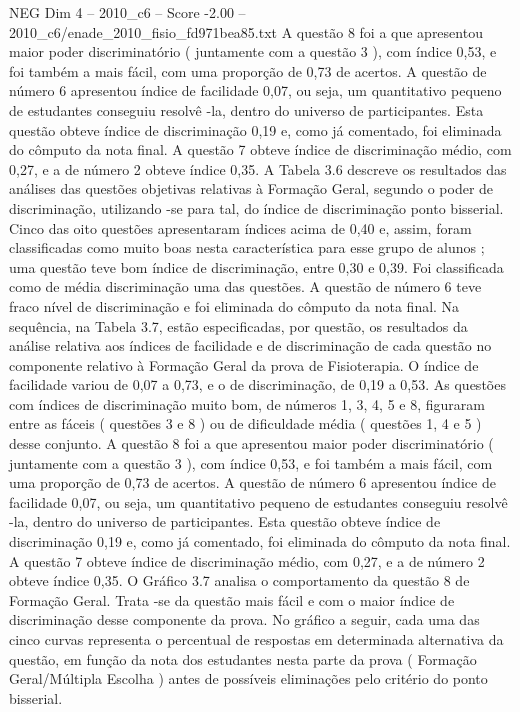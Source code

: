 \begin{textsample}{NEG Dim 4 – 2010\_c6 – Score -2.00 – 2010\_c6/enade\_2010\_fisio\_fd971bea85.txt}
A questão 8 foi a que apresentou maior poder discriminatório ( juntamente com a questão 3 ), com índice 0,53, e foi também a mais fácil, com uma proporção de 0,73 de acertos.
A questão de número 6 apresentou índice de facilidade 0,07, ou seja, um quantitativo pequeno de estudantes conseguiu resolvê -la, dentro do universo de participantes.
Esta questão obteve índice de discriminação 0,19 e, como já comentado, foi eliminada do cômputo da nota final.
A questão 7 obteve índice de discriminação médio, com 0,27, e a de número 2 obteve índice 0,35.
A Tabela 3.6 descreve os resultados das análises das questões objetivas relativas à Formação Geral, segundo o poder de discriminação, utilizando -se para tal, do índice de discriminação ponto bisserial.
Cinco das oito questões apresentaram índices acima de 0,40 e, assim, foram classificadas como muito boas nesta característica para esse grupo de alunos ; uma questão teve bom índice de discriminação, entre 0,30 e 0,39.
Foi classificada como de média discriminação uma das questões.
A questão de número 6 teve fraco nível de discriminação e foi eliminada do cômputo da nota final.
Na sequência, na Tabela 3.7, estão especificadas, por questão, os resultados da análise relativa aos índices de facilidade e de discriminação de cada questão no componente relativo à Formação Geral da prova de Fisioterapia.
O índice de facilidade variou de 0,07 a 0,73, e o de discriminação, de 0,19 a 0,53.
As questões com índices de discriminação muito bom, de números 1, 3, 4, 5 e 8, figuraram entre as fáceis ( questões 3 e 8 ) ou de dificuldade média ( questões 1, 4 e 5 ) desse conjunto.
A questão 8 foi a que apresentou maior poder discriminatório ( juntamente com a questão 3 ), com índice 0,53, e foi também a mais fácil, com uma proporção de 0,73 de acertos.
A questão de número 6 apresentou índice de facilidade 0,07, ou seja, um quantitativo pequeno de estudantes conseguiu resolvê -la, dentro do universo de participantes.
Esta questão obteve índice de discriminação 0,19 e, como já comentado, foi eliminada do cômputo da nota final.
A questão 7 obteve índice de discriminação médio, com 0,27, e a de número 2 obteve índice 0,35.
O Gráfico 3.7 analisa o comportamento da questão 8 de Formação Geral.
Trata -se da questão mais fácil e com o maior índice de discriminação desse componente da prova.
No gráfico a seguir, cada uma das cinco curvas representa o percentual de respostas em determinada alternativa da questão, em função da nota dos estudantes nesta parte da prova ( Formação Geral/Múltipla Escolha ) antes de possíveis eliminações pelo critério do ponto bisserial.

\end{textsample}
